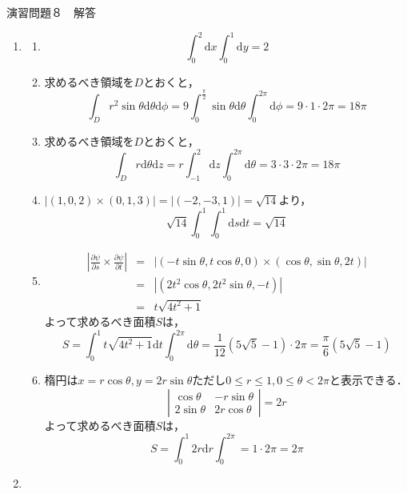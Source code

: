 \documentclass{jarticle}
\def\d{\mathrm d}
\begin{document}
\begin{center} {\Large 演習問題８　解答} \end{center}
\begin{enumerate}
  \item
    \begin{enumerate}
      \item
        \[ \int_0^2 \d x \int_0^1 \d y = 2 \]
      \item
        求めるべき領域を$D$とおくと，
        \[ \int_D r^2 \sin \theta \d \theta \d \phi = 9 \int_0^{\frac{\pi}{2}} \sin \theta \d \theta \int_0^{2\pi} \d \phi = 9 \cdot 1 \cdot 2 \pi = 18 \pi \]
      \item
        求めるべき領域を$D$とおくと，
        \[ \int_D r \d \theta \d z = r \int_{-1}^2 \d z \int_0^{2\pi} \d \theta = 3 \cdot 3 \cdot 2 \pi = 18 \pi \]
      \item
        $|(1,0,2) \times (0,1,3)| = |(-2,-3,1)| = \sqrt{14}$より，
        \[ \sqrt{14} \int_0^1 \int_0^1 \d s \d t = \sqrt{14} \]
      \item
      
        \begin{eqnarray*}
        \left|\frac{\partial \psi}{\partial s} \times \frac{\partial \psi}{\partial t} \right| & = & \left|  (-t\sin\theta,t\cos\theta, 0) \times  (\cos\theta,\sin\theta,2t) \right| \\
        & = & \left| (2t^2\cos\theta, 2t^2\sin\theta,-t) \right| \\
        & = & t\sqrt{4t^{2}+1 }
        \end{eqnarray*}
        よって求めるべき面積$S$は，
        \[ S = \int_0^1  t\sqrt{4t^{2}+1 } \d t \int_0^{2\pi} \d \theta = \frac{1}{12}(5\sqrt{5}-1)\cdot 2\pi = \frac{\pi}{6} (5\sqrt{5}-1) \]
      \item
        楕円は$x=r\cos\theta,y=2r\sin\theta$ただし$0 \leq r \leq 1, 0 \leq \theta < 2\pi$と表示できる．
        \[ 
          \left| \begin{array}{cc}
            \cos\theta & -r\sin\theta \\
            2\sin\theta & 2r\cos\theta
          \end{array} \right| = 2r
        \]
        よって求めるべき面積$S$は，
        \[
          S = \int_0^1 2r \d r \int_0^{2\pi} = 1 \cdot 2\pi = 2\pi
        \]
    \end{enumerate}
  \item


\end{enumerate}
\end{document}
